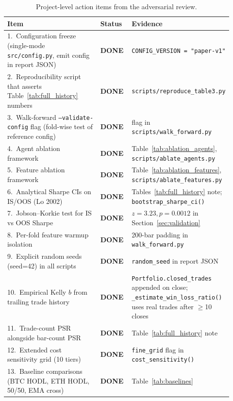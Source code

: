 \documentclass{article}
\begin{document}
\begin{table}[h]
\centering
\caption{Project-level action items from the adversarial review.}
\label{tab:action_items}
\small
\begin{tabular}{@{}p{0.52\linewidth}p{0.15\linewidth}p{0.25\linewidth}@{}}
\toprule
\textbf{Item} & \textbf{Status} & \textbf{Evidence} \\
\midrule
1.~Configuration freeze (single-mode \texttt{src/config.py}, emit config in report JSON) & \textbf{DONE} & \texttt{CONFIG\_VERSION = "paper-v1"} \\
2.~Reproducibility script that asserts Table~\ref{tab:full_history} numbers & \textbf{DONE} & \texttt{scripts/reproduce\_table3.py} \\
3.~Walk-forward \texttt{--validate-config} flag (fold-wise test of reference config) & \textbf{DONE} & flag in \texttt{scripts/walk\_forward.py} \\
4.~Agent ablation framework & \textbf{DONE} & Table~\ref{tab:ablation_agents}, \texttt{scripts/ablate\_agents.py} \\
5.~Feature ablation framework & \textbf{DONE} & Table~\ref{tab:ablation_features}, \texttt{scripts/ablate\_features.py} \\
6.~Analytical Sharpe CIs on IS/OOS (Lo 2002) & \textbf{DONE} & Tables~\ref{tab:full_history} note; \texttt{bootstrap\_sharpe\_ci()} \\
7.~Jobson--Korkie test for IS vs OOS Sharpe & \textbf{DONE} & $z=3.23, p=0.0012$ in Section~\ref{sec:validation} \\
8.~Per-fold feature warmup isolation & \textbf{DONE} & 200-bar padding in \texttt{walk\_forward.py} \\
9.~Explicit random seeds (seed=42) in all scripts & \textbf{DONE} & \texttt{random\_seed} in report JSON \\
10.~Empirical Kelly $b$ from trailing trade history & \textbf{DONE} & \texttt{Portfolio.closed\_trades} appended on close; \texttt{\_estimate\_win\_loss\_ratio()} uses real trades after $\geq$10 closes \\
11.~Trade-count PSR alongside bar-count PSR & \textbf{DONE} & Table~\ref{tab:full_history} note \\
12.~Extended cost sensitivity grid (10 tiers) & \textbf{DONE} & \texttt{fine\_grid} flag in \texttt{cost\_sensitivity()} \\
13.~Baseline comparisons (BTC HODL, ETH HODL, 50/50, EMA cross) & \textbf{DONE} & Table~\ref{tab:baselines} \\
\bottomrule
\end{tabular}
\end{table}
\end{document}
